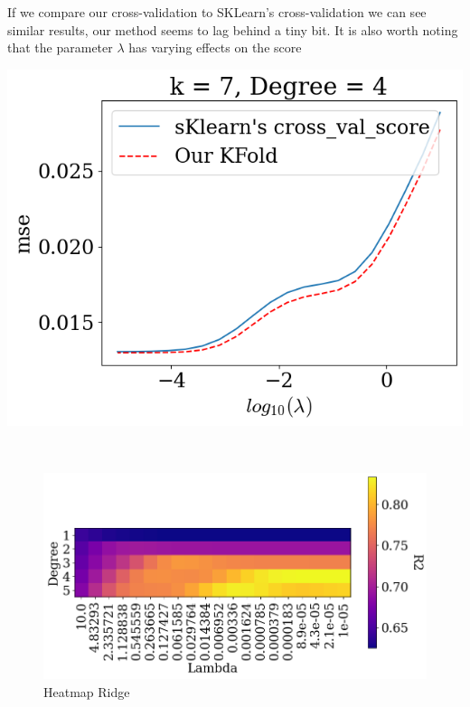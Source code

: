 \documentclass[twoside,11pt]{report}
\begin{document}
\begin{minipage}[t]{.48\linewidth}
    If we compare our cross-validation to SKLearn's cross-validation we can see similar results,
    our method seems to lag behind a tiny bit. It is also worth noting that the parameter $\lambda$ has
    varying effects on the score
\end{minipage}
\hspace{4mm}
\begin{minipage}[!t]{.48\linewidth}
    \begin{center}
        \includegraphics[width=1.0\textwidth]{../runsAndAdditions/crossvalOursVsSklearn.png}
    \end{center}
\end{minipage}\\
\begin{figure}
    \begin{center}
        \includegraphics[width=1.0\textwidth]{../runsAndAdditions/heatmapCrossval.png}
    \end{center}
    \caption{Heatmap Ridge}\label{fig:heatmapCrossval}
\end{figure}
\end{document}
